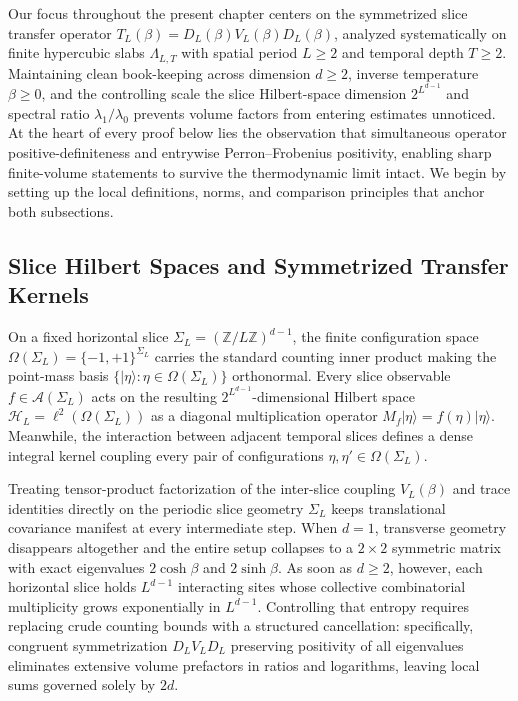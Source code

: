 \documentclass[11pt]{article}
\theoremstyle{definition}
\begin{document}
Our focus throughout the present chapter centers on the symmetrized slice transfer
operator $T_L(\beta) = D_L(\beta) V_L(\beta) D_L(\beta)$, analyzed systematically on
finite hypercubic slabs $\Lambda_{L,T}$ with spatial period $L \ge 2$ and temporal
depth $T \ge 2$. Maintaining clean book-keeping across dimension $d \ge 2$, inverse
temperature $\beta \ge 0$, and the controlling scale the slice Hilbert-space
dimension $2^{L^{d-1}}$ and spectral ratio $\lambda_1/\lambda_0$ prevents volume
factors from entering estimates unnoticed. At the heart of every proof below lies
the observation that simultaneous operator positive-definiteness and entrywise
Perron--Frobenius positivity, enabling sharp finite-volume statements to survive the
thermodynamic limit intact. We begin by setting up the local definitions, norms, and
comparison principles that anchor both subsections.

\subsection{Slice Hilbert Spaces and Symmetrized Transfer Kernels}
\label{subsec:s05a}

On a fixed horizontal slice $\Sigma_L = (\mathbb{Z}/L\mathbb{Z})^{d-1}$, the finite
configuration space $\Omega(\Sigma_L) = \{-1, +1\}^{\Sigma_L}$ carries the standard
counting inner product making the point-mass basis $\{|\eta\rangle : \eta \in
\Omega(\Sigma_L)\}$ orthonormal. Every slice observable $f \in
\mathcal{A}(\Sigma_L)$ acts on the resulting $2^{L^{d-1}}$-dimensional Hilbert space
$\mathcal{H}_L = \ell^2(\Omega(\Sigma_L))$ as a diagonal multiplication operator
$M_f |\eta\rangle = f(\eta) |\eta\rangle$. Meanwhile, the interaction between
adjacent temporal slices defines a dense integral kernel coupling every pair of
configurations $\eta, \eta' \in \Omega(\Sigma_L)$.

Treating tensor-product factorization of the inter-slice coupling $V_L(\beta)$ and
trace identities directly on the periodic slice geometry $\Sigma_L$ keeps
translational covariance manifest at every intermediate step. When $d = 1$,
transverse geometry disappears altogether and the entire setup collapses to a $2
\times 2$ symmetric matrix with exact eigenvalues $2\cosh\beta$ and $2\sinh\beta$.
As soon as $d \ge 2$, however, each horizontal slice holds $L^{d-1}$ interacting
sites whose collective combinatorial multiplicity grows exponentially in $L^{d-1}$.
Controlling that entropy requires replacing crude counting bounds with a structured
cancellation: specifically, congruent symmetrization $D_L V_L D_L$ preserving
positivity of all eigenvalues eliminates extensive volume prefactors in ratios and
logarithms, leaving local sums governed solely by $2d$.
\end{document}

